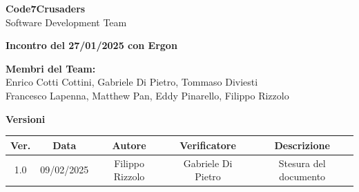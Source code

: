 \documentclass{article}
\begin{document}
\begin{titlepage}
    {\Huge \textbf{Code7Crusaders}}\\
    \vspace{0.5cm}
    {\Large Software Development Team}\\
    \vspace{2cm}
    
    {\large \textbf{Incontro del 27/01/2025 con Ergon}}\\ %
    \vspace{5cm}                           %
    
    
    \textbf{Membri del Team:}\\
    Enrico Cotti Cottini, Gabriele Di Pietro, Tommaso Diviesti \\
    Francesco Lapenna, Matthew Pan, Eddy Pinarello, Filippo Rizzolo \\
    \vspace{0.5cm}
    
    \vspace{1cm}
\end{titlepage}



\newpage
\begin{table}[h!]
\centering
\textbf{Versioni} \\ %
\vspace{2mm} %
\begin{tabular}{|c|c|c|c|c|}
    \hline
    \textbf{Ver.} & \textbf{Data} & \textbf{Autore} & \textbf{Verificatore} & \textbf{Descrizione} \\
    \hline
    1.0 & 09/02/2025 & Filippo Rizzolo & Gabriele Di Pietro  & Stesura del documento \\ 
    \hline                                  %
\end{tabular}
\end{table}



\newpage
\tableofcontents
\end{document}
